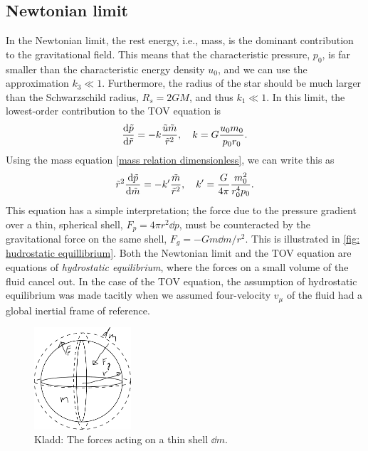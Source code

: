 \subsection{Newtonian limit}

In the Newtonian limit, the rest energy, i.e., mass, is the dominant contribution to the gravitational field.
This means that the characteristic pressure, $p_0$, is far smaller than the characteristic energy density $u_0$, and we can use the approximation $k_3 \ll 1$.
Furthermore, the radius of the star should be much larger than the Schwarzschild radius, $R_s = 2 G M$, and thus $ k_1 \ll 1$.
In this limit, the lowest-order contribution to the TOV equation is
%
\begin{equation}
    \label{Newtonian limit TOV}
    \diff{\tilde p}{\tilde r} = - k \frac{\tilde u \tilde m}{\tilde r^2}, \quad
    k = G \frac{u_0 m_0}{p_0 r_0}.
\end{equation}
%
Using the mass equation \autoref{mass relation dimensionless}, we can write this as
%
\begin{equation}
    \tilde r^2 \diff{\tilde p}{\tilde m}
    = - k' \frac{\tilde m}{\tilde r^2}, 
    \quad k' = \frac{G}{4 \pi } \frac{m_0^2}{r_0^4 p_0}.
\end{equation}
%
This equation has a simple interpretation; the force due to the pressure gradient over a thin, spherical shell, $F_p = 4 \pi r^2 \dd p$, must be counteracted by the gravitational force on the same shell, $F_g = - G m \dd m / r^2$.
This is illustrated in \autoref{fig: hudrostatic equillibrium}.
Both the Newtonian limit and the TOV equation are equations of \emph{hydrostatic equilibrium}, where the forces on a small volume of the fluid cancel out.
In the case of the TOV equation, the assumption of hydrostatic equilibrium was made tacitly when we assumed four-velocity $v_\mu$ of the fluid had a global inertial frame of reference.

\begin{figure}[h]
    \centering
    \includegraphics[width=0.32\textwidth]{figurer/hydrostatic_equillibrium.pdf}
    \caption{Kladd: The forces acting on a thin shell $\dd m$.}
    \label{fig: hudrostatic equillibrium}
\end{figure}

